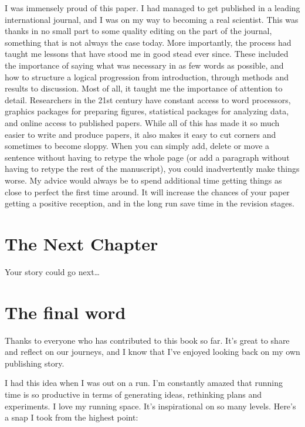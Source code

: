 \documentclass[
]{krantz}
\begin{document}
I was immensely proud of this paper. I had managed to get published in a leading international journal, and I was on my way to becoming a real scientist. This was thanks in no small part to some quality editing on the part of the journal, something that is not always the case today. More importantly, the process had taught me lessons that have stood me in good stead ever since. These included the importance of saying what was necessary in as few words as possible, and how to structure a logical progression from introduction, through methods and results to discussion. Most of all, it taught me the importance of attention to detail. Researchers in the 21st century have constant access to word processors, graphics packages for preparing figures, statistical packages for analyzing data, and online access to published papers. While all of this has made it so much easier to write and produce papers, it also makes it easy to cut corners and sometimes to become sloppy. When you can simply add, delete or move a sentence without having to retype the whole page (or add a paragraph without having to retype the rest of the manuscript), you could inadvertently make things worse. My advice would always be to spend additional time getting things as close to perfect the first time around. It will increase the chances of your paper getting a positive reception, and in the long run save time in the revision stages.

\hypertarget{the-next-chapter}{%
\chapter{The Next Chapter}\label{the-next-chapter}}

Your story could go next\ldots{}

\cleardoublepage

\hypertarget{appendix-appendix}{%
\appendix {}}


\hypertarget{the-final-word}{%
\chapter{The final word}\label{the-final-word}}

Thanks to everyone who has contributed to this book so far. It's great to share and reflect on our journeys, and I know that I've enjoyed looking back on my own publishing story.

I had this idea when I was out on a run. I'm constantly amazed that running time is so productive in terms of generating ideas, rethinking plans and experiments. I love my running space. It's inspirational on so many levels. Here's a snap I took from the highest point:
\end{document}
